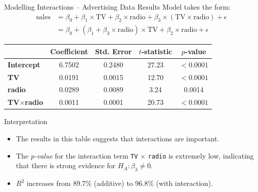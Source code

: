 \documentclass[aspectratio=169, 11pt]{beamer}
\begin{document}
\begin{frame}{Modelling Interactions -- Advertising Data Results}
  Model takes the form:
  \begin{align*}
    \text{sales} &= \beta_0 + \beta_1 \times \text{TV} + \beta_2 \times \text{radio} + \beta_3 \times (\text{TV} \times \text{radio}) + \epsilon \\
    &= \beta_0 + (\beta_1 + \beta_3 \times \text{radio}) \times \text{TV} + \beta_2 \times \text{radio} + \epsilon
  \end{align*}
  \begin{table}
    \centering
    \begin{tabular}{l c c c c}
      \toprule
      & \textbf{Coefficient} & \textbf{Std. Error} & \textbf{$t$-statistic} & \textbf{$p$-value} \\
      \midrule
      \textbf{Intercept}  & 6.7502  & 0.2480  & 27.23 & $< 0.0001$ \\
      \textbf{TV}         & 0.0191  & 0.0015  & 12.70 & $< 0.0001$ \\
      \textbf{radio}      & 0.0289  & 0.0089  & 3.24  & 0.0014     \\
      \textbf{TV$\times$radio} & 0.0011 & 0.0001 & 20.73 & $< 0.0001$ \\
      \bottomrule
    \end{tabular}
  \end{table}
\end{frame}

\begin{frame}{Interpretation}
  \begin{itemize}
    \item The results in this table suggests that interactions are important.
    \item The \textit{p-value} for the interaction term \texttt{TV} $\times$ \texttt{radio} is extremely low, indicating that there is strong evidence for $H_A : \beta_3 \neq 0$.
    \item $R^2$ increases from 89.7\% (additive) to 96.8\% (with interaction).
  \end{itemize}
\end{frame}
\end{document}
